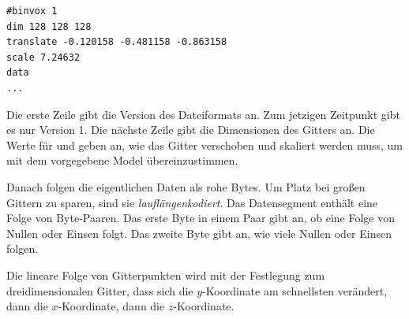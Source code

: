 \begin{verbatim}
#binvox 1
dim 128 128 128
translate -0.120158 -0.481158 -0.863158
scale 7.24632
data
...
\end{verbatim}

Die erste Zeile gibt die Version des Dateiformats an. Zum jetzigen
Zeitpunkt gibt es nur Version 1. Die nächste Zeile gibt die
Dimensionen des Gitters an. Die Werte für
 und  geben an,
wie das Gitter verschoben und skaliert werden muss, um mit dem
vorgegebene Model übereinzustimmen.

Danach folgen die eigentlichen Daten als rohe Bytes. Um Platz bei
großen Gittern zu sparen, sind sie \emph{lauflängenkodiert}. Das
Datensegment enthält eine Folge von Byte-Paaren. Das erste Byte in
einem Paar gibt an, ob eine Folge von Nullen oder Einsen folgt. Das
zweite Byte gibt an, wie viele Nullen oder Einsen folgen.

Die lineare Folge von Gitterpunkten wird mit der Festlegung zum
dreidimensionalen Gitter, dass sich die $y$-Koordinate am schnellsten
verändert, dann die $x$-Koordinate, dann die $z$-Koordinate.

